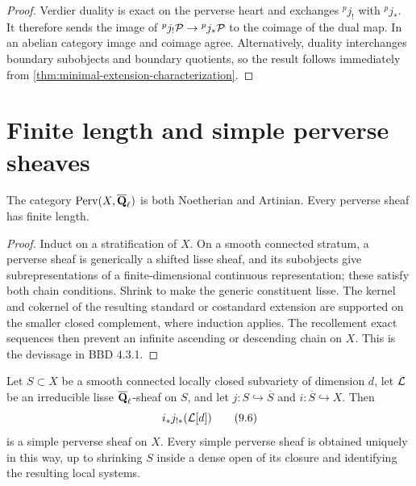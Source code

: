 \begin{proof}
Verdier duality is exact on the perverse heart and exchanges
\({}^pj_!\) with \({}^pj_*\).  It therefore sends the image of
\({}^pj_!\mathcal P\to{}^pj_*\mathcal P\) to the coimage of the dual map.  In an abelian
category image and coimage agree.  Alternatively, duality interchanges
boundary subobjects and boundary quotients, so the result follows immediately
from \cref{thm:minimal-extension-characterization}.
\end{proof}

\section{Finite length and simple perverse sheaves}

\begin{theorem}
\label{thm:perverse-finite-length}
The category \(\operatorname{Perv}(X,\overline{\mathbf Q}_\ell)\) is both Noetherian and Artinian.  Every
perverse sheaf has finite length.
\end{theorem}

\begin{proof}
Induct on a stratification of \(X\).  On a smooth connected stratum, a
perverse sheaf is generically a shifted lisse sheaf, and its subobjects give
subrepresentations of a finite-dimensional continuous representation; these
satisfy both chain conditions.  Shrink to make the generic constituent lisse.
The kernel and cokernel of the resulting standard or costandard extension are
supported on the smaller closed complement, where induction applies.  The
recollement exact sequences then prevent an infinite ascending or descending
chain on \(X\).  This is the devissage in BBD 4.3.1.
\end{proof}

\begin{theorem}
\label{thm:simple-perverse-classification}
Let \(S\subset X\) be a smooth connected locally closed subvariety of
dimension \(d\), let \(\mathcal L\) be an irreducible lisse \(\overline{\mathbf Q}_\ell\)-sheaf on
\(S\), and let \(j:S\hookrightarrow\overline S\) and
\(i:\overline S\hookrightarrow X\).  Then
\[
  i_*j_{!*}(\mathcal L[d])
\tag{9.6}\label{eq:simple-IC-object}
\]
is a simple perverse sheaf on \(X\).  Every simple perverse sheaf is obtained
uniquely in this way, up to shrinking \(S\) inside a dense open of its closure
and identifying the resulting local systems.
\end{theorem}

